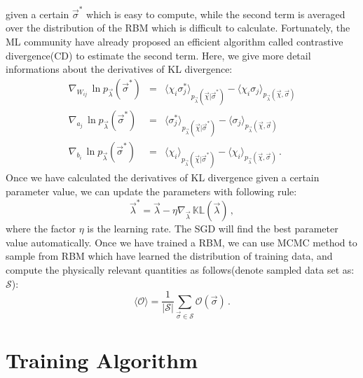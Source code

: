 \documentclass[letterpaper, 10pt]{article}
\newcommand{\qbar}{\rangle}
\newcommand{\qket}{\langle}
\begin{document}
given a certain $ \vec{\sigma}^* $ which is easy to compute, 
while the second term is averaged over the distribution of the RBM which is difficult to calculate. 
Fortunately, the ML community have already proposed an efficient algorithm 
called contrastive divergence(CD) to estimate the second term. 
Here, we give more detail informations about the derivatives of KL divergence:
\begin{eqnarray}
\nabla_{W_{ij}} \, \ln{p_{\vec{\lambda}}(\vec{\sigma}^*)} 
& = & \qket \chi_i \sigma_j^* \qbar_{{p_{\vec{\lambda}}(\vec{\chi} | \vec{\sigma}^*)}} - 
\qket \chi_i \sigma_j \qbar_{{p_{\vec{\lambda}}(\vec{\chi},\vec{\sigma})}}\label{eq:eq4} \\
\nabla_{a_j} \, \ln{p_{\vec{\lambda}}(\vec{\sigma}^*)} 
& = & \qket \sigma_j^* \qbar_{{p_{\vec{\lambda}}(\vec{\chi} | \vec{\sigma}^*)}} - 
\qket \sigma_j \qbar_{{p_{\vec{\lambda}}(\vec{\chi},\vec{\sigma})}}\label{eq:eq5} \\
\nabla_{b_i} \, \ln{p_{\vec{\lambda}}(\vec{\sigma}^*)} 
& = & \qket \chi_i \qbar_{{p_{\vec{\lambda}}(\vec{\chi} | \vec{\sigma}^*)}} - 
\qket \chi_i \qbar_{{p_{\vec{\lambda}}(\vec{\chi},\vec{\sigma})}}\,.\label{eq:eq6}
\end{eqnarray}
Once we have calculated the derivatives of KL divergence given a certain parameter value, 
we can update the parameters with following rule:
\[ \vec{\lambda}^* = \vec{\lambda} - \eta \nabla_{\vec{\lambda}} \, \mathbb{KL}(\vec{\lambda})\,, \]
where the factor $ \eta $ is the learning rate. 
The SGD will find the best parameter value automatically. 
Once we have trained a RBM, we can use MCMC method to sample from RBM 
which have learned the distribution of training data, 
and compute the physically relevant quantities as follows(denote sampled data set as: $ \mathcal{S} $):
\[ \qket \mathcal{O} \qbar = \frac{1}{|\mathcal{S}|} \sum_{\vec{\sigma} \in \mathcal{S}} \mathcal{O}(\vec{\sigma})\,. \]


\section{Training Algorithm}
\end{document}
